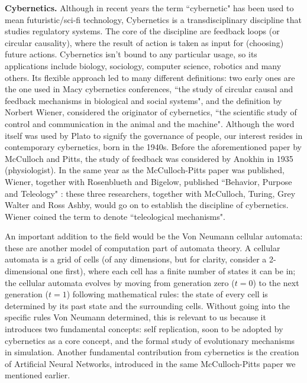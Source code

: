 \documentclass[../main.tex]{subfiles}
\begin{document}
\vspace{4pt}
\textbf{Cybernetics.}
Although in recent years the term ``cybernetic" has been used to mean futuristic/sci-fi technology, Cybernetics is a transdisciplinary discipline that studies regulatory systems. The core of the discipline are feedback loops (or circular causality), where the result of action is taken as input for (choosing) future actions. Cybernetics isn't bound to any particular usage, so its applications include biology, sociology, computer science, robotics and many others. Its flexible approach led to many different definitions: two early ones are the one used in Macy cybernetics conferences, ``the study of circular causal and feedback mechanisms in biological and social systems"\cite{steerCyberneticsCircularCausal1952}, and the definition by Norbert Wiener, considered the originator of cybernetics, ``the scientific study of control and communication in the animal and the machine"\cite{wienerCyberneticsControlCommunication1961}. Although the word itself was used by Plato to signify the governance of people, our interest resides in contemporary cybernetics, born in the 1940s. Before the aforementioned paper by McCulloch and Pitts, the study of feedback was considered by Anokhin in 1935 \cite{anokhinProblemsCentrePeriphery1935} (physiologist). In the same year as the McCulloch-Pitts paper was published, Wiener, together with Rosenblueth and Bigelow, published ``Behavior, Purpose and Teleology" \cite{rosenbluethBehaviorPurposeTeleology1943}: these three researchers, together with McCulloch, Turing, Grey Walter and Ross Ashby, would go on to establish the discipline of cybernetics. Wiener coined the term to denote ``teleological mechanisms".

An important addition to the field would be the Von Neumann cellular automata: these are another model of computation part of automata theory. A cellular automata is a grid of cells (of any dimensions, but for clarity, consider a 2-dimensional one first), where each cell has a finite number of states it can be in; the cellular automata evolves by moving from generation zero ($t=0$) to the next generation ($t=1$) following mathematical rules: the state of every cell is determined by its past state and the surrounding cells. Without going into the specific rules Von Neumann determined, this is relevant to us because it introduces two fundamental concepts: self replication, soon to be adopted by cybernetics as a core concept, and the formal study of evolutionary mechanisms in simulation. Another fundamental contribution from cybernetics is the creation of Artificial Neural Networks, introduced in the same McCulloch-Pitts paper we mentioned earlier.
\end{document}
